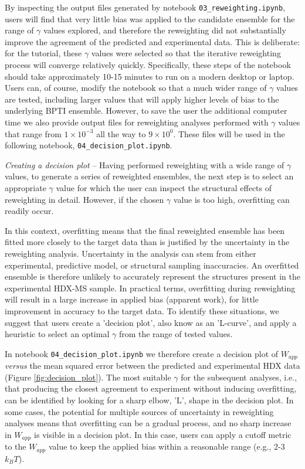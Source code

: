 \documentclass[9pt,tutorial]{livecoms}
\begin{document}
By inspecting the output files generated by notebook \texttt{03\_reweighting.ipynb}, users will find that very little bias was applied to the candidate ensemble for the range of $\gamma$ values explored, and therefore the reweighting did not substantially improve the agreement of the predicted and experimental data.
This is deliberate: for the tutorial, these $\gamma$ values were selected so that the iterative reweighting process will converge relatively quickly. 
Specifically, these steps of the notebook should take approximately 10-15 minutes to run on a modern desktop or laptop.
Users can, of course, modify the notebook so that a much wider range of $\gamma$ values are tested, including larger values that will apply higher levels of bias to the underlying BPTI ensemble.
However, to save the user the additional computer time we also provide output files for reweighting analyses performed with $\gamma$ values that range from $1\times10^{-3}$ all the way to $9\times10^{0}$. 
These files will be used in the following notebook, \texttt{04\_decision\_plot.ipynb}.

\noindent
\textit{Creating a decision plot} -- Having performed reweighting with a wide range of $\gamma$ values, to generate a series of reweighted ensembles, the next step is to select an appropriate $\gamma$ value for which the user can inspect the structural effects of reweighting in detail.
However, if the chosen $\gamma$ value is too high, overfitting can readily occur. 

In this context, overfitting means that the final reweighted ensemble has been fitted more closely to the target data than is justified by the uncertainty in the reweighting analysis.
Uncertainty in the analysis can stem from either experimental, predictive model, or structural sampling inaccuracies.
An overfitted ensemble is therefore unlikely to accurately represent the structures present in the experimental HDX-MS sample.
In practical terms, overfitting during reweighting will result in a large increase in applied bias (apparent work), for little improvement in accuracy to the target data.
To identify these situations, we suggest that users create a 'decision plot', also know as an 'L-curve', and apply a heuristic to select an optimal $\gamma$ from the range of tested values.

In notebook \texttt{04\_decision\_plot.ipynb} we therefore create a decision plot of $W_{app}$ \textit{versus} the mean squared error between the predicted and experimental HDX data (Figure \ref{fig:decision_plot}).
The most suitable $\gamma$ for the subsequent analyses, i.e., that producing the closest agreement to experiment without inducing overfitting, can be identified by looking for a sharp elbow, 'L', shape in the decision plot.
In some cases, the potential for multiple sources of uncertainty in reweighting analyses means that overfitting can be a gradual process, and no sharp increase in $W_{app}$ is visible in a decision plot.
In this case, users can apply a cutoff metric to the $W_{app}$ value to keep the applied bias within a reasonable range (e.g., 2-3 $k_BT$). 
\end{document}
